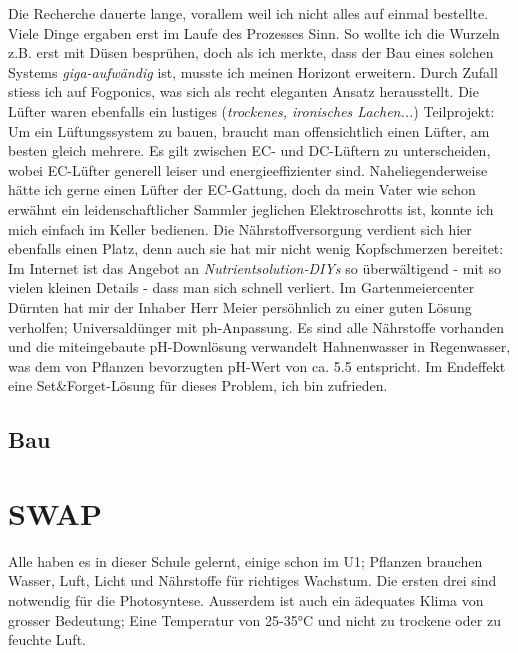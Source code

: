 \documentclass[12pt,titlepage,a4paper]{article}
\begin{document}
Die Recherche dauerte lange, vorallem weil ich nicht alles auf einmal bestellte. Viele Dinge ergaben erst im Laufe des Prozesses Sinn. So wollte ich die Wurzeln z.B. erst  mit Düsen besprühen, doch als ich merkte, dass der Bau eines solchen Systems \textit{giga-aufwändig} ist, musste ich meinen Horizont erweitern.
Durch Zufall stiess ich auf Fogponics, was sich als recht eleganten Ansatz herausstellt.
Die Lüfter waren ebenfalls ein lustiges (\textit{trockenes, ironisches Lachen...}) Teilprojekt: Um ein Lüftungssystem zu bauen, braucht man offensichtlich einen Lüfter, am besten gleich mehrere. Es gilt zwischen EC- und DC-Lüftern zu unterscheiden, wobei EC-Lüfter generell leiser und energieeffizienter sind. Naheliegenderweise hätte ich gerne einen Lüfter der EC-Gattung, doch da mein Vater wie schon erwähnt ein leidenschaftlicher Sammler jeglichen Elektroschrotts ist, konnte ich mich einfach im Keller bedienen.
Die Nährstoffversorgung verdient sich hier ebenfalls einen Platz, denn auch sie hat mir nicht wenig Kopfschmerzen bereitet: Im Internet ist das Angebot an \textit{Nutrientsolution-DIYs} so überwältigend - mit so vielen kleinen Details - dass man sich schnell verliert. Im Gartenmeiercenter Dürnten hat mir der Inhaber Herr Meier persöhnlich zu einer guten Lösung verholfen; Universaldünger mit ph-Anpassung. Es sind alle Nährstoffe vorhanden und die miteingebaute pH-Downlösung verwandelt Hahnenwasser in Regenwasser, was dem von Pflanzen bevorzugten pH-Wert von ca. 5.5 entspricht. Im Endeffekt eine Set&Forget-Lösung für dieses Problem, ich bin zufrieden.




\subsection{Bau}

















\newpage


\section{SWAP}


Alle haben es in dieser Schule gelernt, einige schon im U1; Pflanzen brauchen Wasser, Luft, Licht und Nährstoffe für richtiges Wachstum. Die ersten drei sind notwendig für die Photosyntese. Ausserdem ist auch ein ädequates Klima von grosser Bedeutung; Eine Temperatur von 25-35°C und nicht zu trockene oder zu feuchte Luft.
\end{document}
